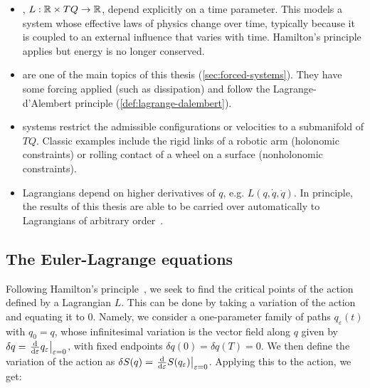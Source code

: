 \begin{itemize}
	\item {}, $L : {\mathbb{R}} \times TQ \to {\mathbb{R}}$, depend explicitly on a time parameter. This models a system whose effective laws of physics change over time, typically because it is coupled to an external influence that varies with time. Hamilton's principle applies but energy is no longer conserved.
	\item {} are one of the main topics of this thesis (\cref{sec:forced-systems}). They have some forcing applied (such as dissipation) and follow the Lagrange-d'Alembert principle (\cref{def:lagrange-dalembert}).
	\item {} systems restrict the admissible configurations or velocities to a submanifold of $TQ$. Classic examples include the rigid links of a robotic arm (holonomic constraints) or rolling contact of a wheel on a surface (nonholonomic constraints).
	\item {} Lagrangians depend on higher derivatives of $q$, e.g. $L(q, \dot{q}, \ddot{q})$. In principle, the results of this thesis are able to be carried over automatically to Lagrangians of arbitrary order~\cite[\S2.2]{ferraroParallelIterativeMethod2025}\cite[\S2]{gay-balmazInvariantHigherorderVariational2012}.
\end{itemize}

\subsection{The Euler-Lagrange equations}

Following Hamilton's principle~\cite[\S1.3]{marsdenIntroductionMechanicsSymmetry1999}, we seek to find the critical points of the action defined by a Lagrangian $L$. This can be done by taking a variation of the action and equating it to $0$. Namely, we consider a one-parameter family of paths $q_\varepsilon(t)$ with $q_0 = q$, whose infinitesimal variation is the vector field along $q$ given by $\delta q=\odv*{q_{\varepsilon}}{\varepsilon}_{\varepsilon=0}$, with fixed endpoints $\delta q(0) = \delta q(T) = 0$. We then define the variation of the action as $\delta S(q) = \odv*{S(q_\varepsilon)}{\varepsilon}_{\varepsilon=0}$.
Applying this to the action, we get:

